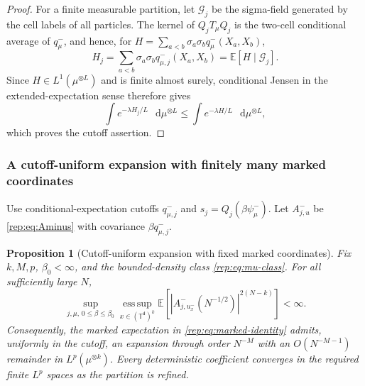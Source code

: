 \documentclass[11pt,reqno]{amsart}
\numberwithin{equation}{section}
\theoremstyle{plain}
\newtheorem{prop}[prop]{Proposition}
\theoremstyle{definition}
\renewcommand{\d}{\mathsf d}
\newcommand{\dd}{\mathop{}\!\mathrm d}
\newcommand{\T}{\mathbb T}
\newcommand{\E}{\mathbb E}
\newcommand{\be}{\beta}
\begin{document}
\begin{proof}
For a finite measurable partition, let $\mathcal G_j$ be the sigma-field generated by the cell labels of all particles.  The kernel of $Q_jT_\mu Q_j$ is the two-cell conditional average of $q^-_\mu$, and hence, for
$H=\sum_{a<b}\sigma_a\sigma_bq^-_\mu(X_a,X_b)$,
\begin{equation}
 H_j=\sum_{a<b}\sigma_a\sigma_bq^-_{\mu,j}(X_a,X_b)
 =\E[H\mid\mathcal G_j].
\end{equation}
Since $H\in L^1(\mu^{\otimes L})$ and is finite almost surely, conditional Jensen in the extended-expectation sense therefore gives
\begin{equation}\label{rep:eq:conditional-Jensen-signed}
 \int e^{-\lambda H_j/L}\,\dd\mu^{\otimes L}
 \le\int e^{-\lambda H/L}\,\dd\mu^{\otimes L},
\end{equation}
which proves the cutoff assertion.
\end{proof}

\subsubsection{A cutoff-uniform expansion with finitely many marked coordinates}

Use conditional-expectation cutoffs $q^-_{\mu,j}$ and $s_j=Q_j(\be\psi^-_\mu)$.  Let $A^-_{j,u}$ be \eqref{rep:eq:Aminus} with covariance $\be q^-_{\mu,j}$.

\begin{prop}[Cutoff-uniform expansion with fixed marked coordinates]\label{rep:prop:exact-remaining}
Fix $k,M,p$, $\be_0<\infty$, and the bounded-density class \eqref{rep:eq:mu-class}.  For all sufficiently large $N$,
\begin{equation}\label{rep:eq:exact-exponential-moment}
 \sup_{j,\mu,\,0\le\be\le\be_0}
 \operatorname*{ess\,sup}_{x\in(\T^{\d})^k}
 \E\left[\left|A^-_{j,u_x^-}(N^{-1/2})\right|^{2(N-k)}\right]
 <\infty.
\end{equation}
Consequently, the marked expectation in \eqref{rep:eq:marked-identity} admits, uniformly in the cutoff, an expansion through order $N^{-M}$ with an $O(N^{-M-1})$ remainder in $L^p(\mu^{\otimes k})$.  Every deterministic coefficient converges in the required finite $L^p$ spaces as the partition is refined.
\end{prop}
\end{document}
